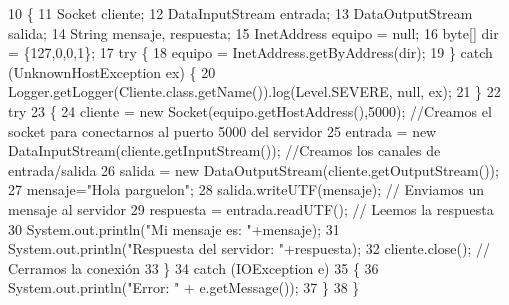 \begin{DoxyCode}
10     \{
11         Socket cliente;
12         DataInputStream entrada;
13         DataOutputStream salida;
14         String mensaje, respuesta;
15         InetAddress equipo = null;
16         byte[] dir = \{127,0,0,1\};
17         \textcolor{keywordflow}{try} \{
18             equipo = InetAddress.getByAddress(dir);
19         \} \textcolor{keywordflow}{catch} (UnknownHostException ex) \{
20             Logger.getLogger(Cliente.class.getName()).log(Level.SEVERE, null, ex);
21         \}
22         \textcolor{keywordflow}{try}
23         \{
24             cliente = \textcolor{keyword}{new} Socket(equipo.getHostAddress(),5000);   \textcolor{comment}{//Creamos el socket para conectarnos al
       puerto 5000 del servidor}
25             entrada = \textcolor{keyword}{new} DataInputStream(cliente.getInputStream());  \textcolor{comment}{//Creamos los canales de
       entrada/salida}
26             salida = \textcolor{keyword}{new} DataOutputStream(cliente.getOutputStream());
27             mensaje=\textcolor{stringliteral}{"Hola parguelon"};
28             salida.writeUTF(mensaje);                                 \textcolor{comment}{// Enviamos un mensaje al servidor}
29             respuesta = entrada.readUTF();                            \textcolor{comment}{// Leemos la respuesta}
30             System.out.println(\textcolor{stringliteral}{"Mi mensaje es: "}+mensaje);
31             System.out.println(\textcolor{stringliteral}{"Respuesta del servidor: "}+respuesta);
32             cliente.close();                                          \textcolor{comment}{// Cerramos la conexión}
33         \}
34         \textcolor{keywordflow}{catch} (IOException e)
35         \{
36             System.out.println(\textcolor{stringliteral}{"Error: "} + e.getMessage());
37         \}
38     \}
\end{DoxyCode}
